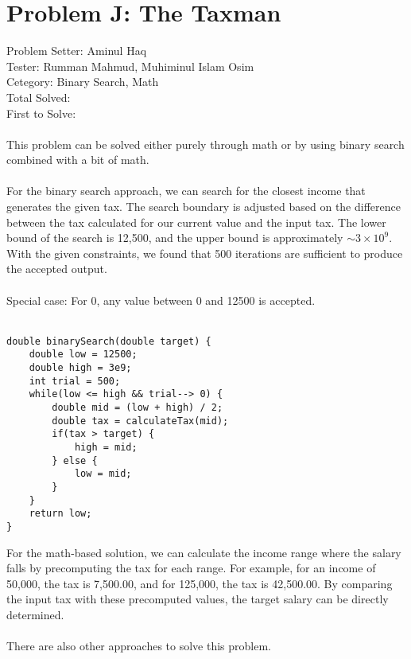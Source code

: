 \section*{Problem J: The Taxman}
Problem Setter: Aminul Haq \\
Tester: Rumman Mahmud,  Muhiminul Islam Osim \\
Cetegory: Binary Search, Math \\
Total Solved:  \\
First to Solve: \\
\\
This problem can be solved either purely through math or by using binary search combined with a bit of math. \\
\\
For the binary search approach, we can search for the closest income that generates the given tax. The search boundary is adjusted based on the difference between the tax calculated for our current value and the input tax. The lower bound of the search is 12,500, and the upper bound is approximately \(\sim 3 \times 10^9\). With the given constraints, we found that 500 iterations are sufficient to produce the accepted output.\\
\\
Special case: For 0, any value between 0 and 12500 is accepted.\\
\\
\begin{verbatim}
double binarySearch(double target) {
    double low = 12500;
    double high = 3e9;
    int trial = 500;
    while(low <= high && trial--> 0) {
        double mid = (low + high) / 2;
        double tax = calculateTax(mid);
        if(tax > target) {
            high = mid;
        } else {
            low = mid;
        }
    }
    return low;
}
\end{verbatim}

For the math-based solution, we can calculate the income range where the salary falls by precomputing the tax for each range. For example, for an income of 50,000, the tax is 7,500.00, and for 125,000, the tax is 42,500.00. By comparing the input tax with these precomputed values, the target salary can be directly determined.\\
\\
There are also other approaches to solve this problem.\\
